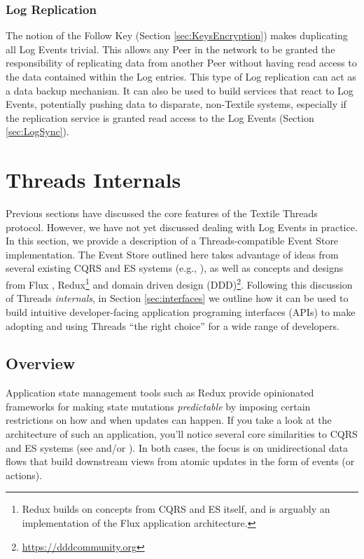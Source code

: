 \documentclass{textile}
\begin{document}
\subsubsection{Log Replication}

The notion of the Follow Key (Section  \ref{sec:KeysEncryption}) makes duplicating all Log Events trivial. This allows any Peer in the network to be granted the responsibility of replicating data from another Peer without having read access to the data contained within the Log entries. This type of Log replication can act as a data backup mechanism. It can also be used to build services that react to Log Events, potentially pushing data to disparate, non-Textile systems, especially if the replication service is granted read access to the Log Events (Section  \ref{sec:LogSync}).

\section{Threads Internals}\label{sec:internals}

Previous sections have discussed the core features of the Textile Threads protocol. However, we have not yet discussed dealing with Log Events in practice. In this section, we provide a description of a Threads-compatible Event Store implementation. The Event Store outlined here takes advantage of ideas from several existing CQRS and ES systems (e.g., \cite{ereminReduxInspiredBackend2019}), as well as concepts and designs from Flux \cite{facebookFluxInDepthOverview2019}, Redux\footnote{Redux builds on concepts from CQRS and ES itself, and is arguably an implementation of the Flux application architecture.} \cite{reduxMotivation} and domain driven design \cite{evansDomaindrivenDesignTackling2004a} (DDD)\footnote{\url{https://dddcommunity.org}}. Following this discussion of Threads \emph{internals}, in Section \ref{sec:interfaces} we outline how it can be used to build intuitive developer-facing application programing interfaces (APIs) to make adopting and using Threads ``the right choice'' for a wide range of developers.

\subsection{Overview}

Application state management tools such as Redux provide opinionated frameworks for making state mutations \emph{predictable} by imposing certain restrictions on how and when updates can happen. If you take a look at the architecture of such an application, you'll notice several core similarities to CQRS and ES systems (see \cite{facebookFluxInDepthOverview2019} and/or \cite{abramovCaseFlux2015}). In both cases, the focus is on unidirectional data flows that build downstream views from atomic updates in the form of events (or actions).
\end{document}
